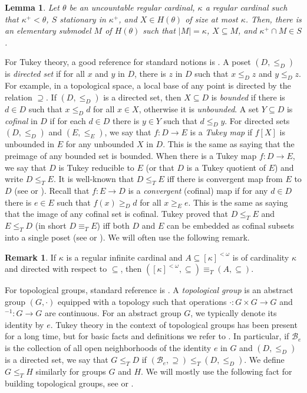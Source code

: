 \documentclass{amsart}
\theoremstyle{plain}
\newtheorem{lemma}[theorem]{Lemma}
\theoremstyle{definition}
\newtheorem{remark}[theorem]{Remark}
\numberwithin{equation}{section}
\renewcommand{\k}{\kappa}
\renewcommand{\o}{\omega}
\newcommand{\sst}{\subseteq}
\newcommand{\abs}[1]{\left\vert#1\right\vert}
\begin{document}
\begin{lemma}\label{l:elsubmodel}
	Let $\theta$ be an uncountable regular cardinal, $\k$ a regular cardinal such that $\k^+<\theta$, $S$ stationary in $\k^+$, and $X\in H(\theta)$ of size at most $\k$.
	Then, there is an elementary submodel $M$ of $H(\theta)$ such that $\abs{M}=\k$, $X\sst M$, and $\k^+\cap M\in S$.
\end{lemma}

For Tukey theory, a good reference for standard notions is \cite{stevodirected}.
A poset $(D,\le_D)$ is \emph{directed set} if for all $x$ and $y$ in $D$, there is $z$ in $D$ such that $x\le_D z$ and $y\le_D z$.
For example, in a topological space, a local base of any point is directed by the relation $\supseteq$.
If $(D,\le_D)$ is a directed set, then $X\sst D$ is \emph{bounded} if there is $d\in D$ such that $x\le_D d$ for all $x\in X$, otherwise it is \emph{unbounded}.
A set $Y\sst D$ is \emph{cofinal} in $D$ if for each $d\in D$ there is $y\in Y$ such that $d\le_D y$.
For directed sets $(D,\le_D)$ and $(E,\le_E)$, we say that $f:D\to E$ is a \emph{Tukey map} if $f[X]$ is unbounded in $E$ for any unbounded $X$ in $D$.
This is the same as saying that the preimage of any bounded set is bounded.
When there is a Tukey map $f:D\to E$, we say that $D$ is Tukey reducible to $E$ (or that $D$ is a Tukey quotient of $E$) and write $D\le_T E$.
It is well-known that $D\le_T E$ iff there is convergent map from $E$ to $D$ (see \cite{stevodirected} or \cite{schmidt}).
Recall that $f:E\to D$ is a \emph{convergent} (cofinal) map if for any $d\in D$ there is $e\in E$ such that $f(x)\ge_D d$ for all $x\ge_E e$.
This is the same as saying that the image of any cofinal set is cofinal.
Tukey proved that $D\le_T E$ and $E\le_T D$ (in short $D\equiv_T E$) iff both $D$ and $E$ can be embedded as cofinal subsets into a single poset (see \cite{tukey} or \cite{stevodirected}).
We will often use the following remark.

\begin{remark}\label{r:types}
	If $\k$ is a regular infinite cardinal and $A\sst [\k]^{<\o}$ is of cardinality $\k$ and directed with respect to $\sst$, then $\left([\k]^{<\o},\sst\right)\equiv_T (A,\sst)$.
\end{remark}

For topological groups, standard reference is \cite{knjiga}.
A \emph{topological group} is an abstract group $(G,\cdot)$ equipped with a topology such that operations $\cdot:G\times G\to G$ and ${}^{-1}:G\to G$ are continuous.
For an abstract group $G$, we typically denote its identity by $e$.
Tukey theory in the context of topological groups has been present for a long time, but for basic facts and definitions we refer to \cite{km}. In particular, if $\mathcal B_e$ is the collection of all open neighborhoods of the identity $e$ in $G$ and $(D,\le_D)$ is a directed set, we say that $G\le_T D$ if $(\mathcal B_e,\supseteq)\le_T (D,\le_D)$.
We define $G\le_T H$ similarly for groups $G$ and $H$.
We will mostly use the following fact for building topological groups, see \cite[Theorem 1.3.12]{knjiga} or \cite[Theorem 4.5]{hr}.
\end{document}
